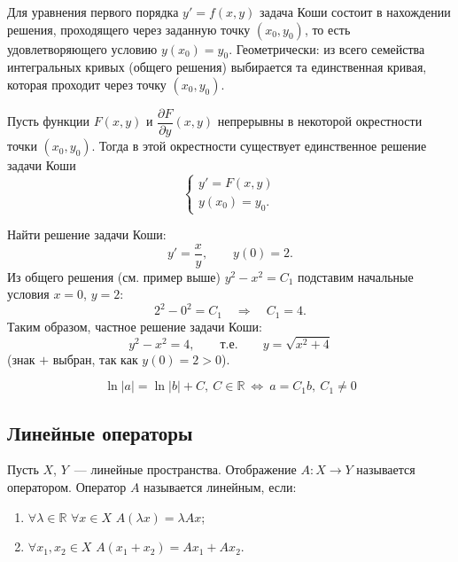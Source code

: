 \documentclass[12pt]{article}
\begin{document}
    \begin{note}
    	Для уравнения первого порядка $y' = f(x, y)$ задача Коши состоит в нахождении решения, проходящего через заданную точку $(x_0, y_0)$, то есть удовлетворяющего условию $y(x_0) = y_0$. Геометрически: из всего семейства интегральных кривых (общего решения) выбирается та единственная кривая, которая проходит через точку $(x_0, y_0)$.
    \end{note}

    \begin{theorem}
    	Пусть функции $F(x, y)$ и $\dfrac{\partial F}{\partial y}(x, y)$ непрерывны в некоторой окрестности точки $(x_0, y_0)$. Тогда в этой окрестности существует единственное решение задачи Коши
    	\[
    		\begin{cases}
    			y' = F(x, y) \\
    			y(x_0) = y_0.
    		\end{cases}
    	\]
    \end{theorem}

    \begin{example}
    	Найти решение задачи Коши:
    	\[
    		y' = \frac{x}{y}, \qquad y(0) = 2.
    	\]
    	Из общего решения (см. пример выше) $y^2 - x^2 = C_1$ подставим начальные условия $x = 0$, $y = 2$:
    	\[
    		2^2 - 0^2 = C_1 \quad\Longrightarrow\quad C_1 = 4.
    	\]
    	Таким образом, частное решение задачи Коши:
    	\[
    		y^2 - x^2 = 4, \qquad \text{т.е.}\qquad y = \sqrt{x^2 + 4}
    	\]
    	(знак $+$ выбран, так как $y(0) = 2 > 0$).
    \end{example}
    
    \begin{statement}
    	\[
			\ln |a| = \ln |b| + C, \ C \in \mathbb{R} \ \Leftrightarrow \ a = C_1 b, \ C_1 \ne 0
		\]
    \end{statement}
    
    \subsection{Линейные операторы}
    
    \begin{definition}
    	Пусть $X$, $Y$~--- линейные пространства. Отображение $A: X \rightarrow Y$ называется оператором. Оператор $A$ называется линейным, если:
    	\begin{enumerate}
    		\item $\forall \lambda \in \mathbb{R}$ $\forall x \in X$ $A(\lambda x) = \lambda Ax$;
    		\item $\forall x_1, x_2 \in X$ $A(x_1 + x_2) = Ax_1 + Ax_2$.
    	\end{enumerate}
    \end{definition}
    
\end{document}
